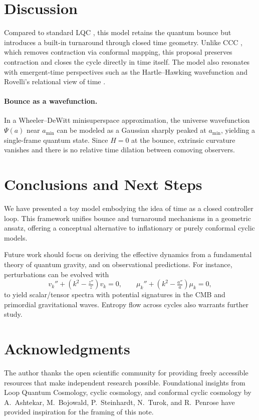 \documentclass[12pt]{article}
\begin{document}
\section{Discussion}
Compared to standard LQC \cite{Ashtekar2006}, this model retains the quantum bounce but introduces 
a built-in turnaround through closed time geometry. Unlike CCC \cite{Penrose2010}, which removes 
contraction via conformal mapping, this proposal preserves contraction and closes the cycle 
directly in time itself. The model also resonates with emergent-time perspectives such as the 
Hartle--Hawking wavefunction \cite{Hartle1983} and Rovelli's relational view of time \cite{Rovelli2017}. 

\paragraph{Bounce as a wavefunction.} In a Wheeler--DeWitt minisuperspace approximation, 
the universe wavefunction $\Psi(a)$ near $a_{\min}$ can be modeled as a Gaussian sharply 
peaked at $a_{\min}$, yielding a single-frame quantum state. Since $H=0$ at the bounce, 
extrinsic curvature vanishes and there is no relative time dilation between comoving observers.

\section{Conclusions and Next Steps}
We have presented a toy model embodying the idea of time as a closed controller loop. This framework 
unifies bounce and turnaround mechanisms in a geometric ansatz, offering a conceptual alternative to 
inflationary or purely conformal cyclic models. 

Future work should focus on deriving the effective dynamics from a fundamental theory of quantum gravity, 
and on observational predictions. For instance, perturbations can be evolved with
\begin{equation}
v_k''+(k^2-\tfrac{z''}{z})v_k=0,\qquad
\mu_k''+(k^2-\tfrac{a''}{a})\mu_k=0,
\end{equation}
to yield scalar/tensor spectra with potential signatures in the CMB and primordial gravitational waves. 
Entropy flow across cycles also warrants further study.

\section*{Acknowledgments}
The author thanks the open scientific community for providing freely accessible resources 
that make independent research possible. Foundational insights from Loop Quantum Cosmology, 
cyclic cosmology, and conformal cyclic cosmology by A.~Ashtekar, M.~Bojowald, P.~Steinhardt, 
N.~Turok, and R.~Penrose have provided inspiration for the framing of this note.
\end{document}
